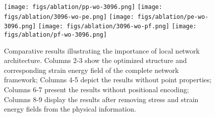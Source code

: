 \begin{figure}[htbp]
\begin{graybox}
    \texttt{[image: figs/ablation/pp-wo-3096.png]}\hspace{0.2cm}
    \texttt{[image: figs/ablation/3096-wo-pe.png]}\hspace{0.02cm}
    \texttt{[image: figs/ablation/pe-wo-3096.png]}\hspace{0.2cm}
    \texttt{[image: figs/ablation/3096-wo-pf.png]}\hspace{0.02cm}
    \texttt{[image: figs/ablation/pf-wo-3096.png]}
    \\
    \footnotesize{
    \hspace{0.2cm}
    \hspace{0.02cm}
    \hspace{0.2cm}
    \hspace{0.02cm}
    \hspace{0.2cm}
    \hspace{0.02cm}
    \hspace{0.02cm}
    }
    \end{graybox}
    \small{
    }
    \caption{Comparative results illustrating the importance of local network architecture. Columns 2-3 show the optimized structure and corresponding strain energy field of the complete network framework; Columns 4-5 depict the results without point properties; Columns 6-7 present the results without positional encoding; Columns 8-9 display the results after removing stress and strain energy fields from the physical information.}
    \label{fig:ablation}
\end{figure}